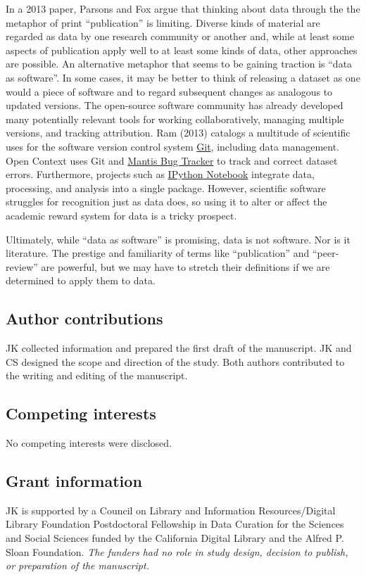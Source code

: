 \documentclass[10pt,a4paper,twocolumn]{article}
\begin{document}
{{In a 2013 paper\cite{parsons_is_2013}, Parsons and Fox argue that thinking about data through the the metaphor of print ``publication'' is limiting.
Diverse kinds of material are regarded as data by one research community or another and, while at least some aspects of publication apply well to at least some kinds of data, other approaches are possible.
An alternative metaphor that seems to be gaining traction is ``data as software''\cite{schopf_treating_2012}.
In some cases, it may be better to think of releasing a dataset as one would a piece of software and to regard subsequent changes as analogous to updated versions.
The open-source software community has already developed many potentially relevant tools for working collaboratively, managing multiple versions, and tracking attribution.
Ram (2013)\cite{ram_git_2013} catalogs a multitude of scientific uses for the software version control system \href{http://git-scm.com/}{Git}, including data management.
Open Context uses Git and \href{http://www.mantisbt.org/}{Mantis Bug Tracker} to track and correct dataset errors.
Furthermore, projects such as \href{http://ipython.org/notebook}{IPython Notebook} integrate data, processing, and analysis into a single package.
However, scientific software struggles for recognition\cite{pradal_publishing_2013} just as data does, so using it to alter or affect the academic reward system for data is a tricky prospect.

Ultimately, while ``data as software'' is promising, data is not software.
Nor is it literature. 
The prestige and familiarity of terms like ``publication'' and ``peer-review'' are powerful, but we may have to stretch their definitions if we are determined to apply them to data.


\subsection*{Author contributions}
JK collected information and prepared the first draft of the manuscript.
JK and CS designed the scope and direction of the study.
Both authors contributed to the writing and editing of the manuscript.

\subsection*{Competing interests}
No competing interests were disclosed.

\subsection*{Grant information}
JK is supported by a Council on Library and Information Resources/Digital Library Foundation Postdoctoral Fellowship in Data Curation for the Sciences and Social Sciences funded by the California Digital Library and the Alfred P. Sloan Foundation.
\emph{The funders had no role in study design, decision to publish, or preparation of the manuscript.}

}}
\end{document}
